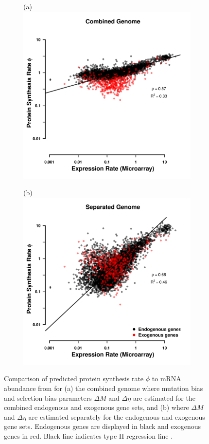 \documentclass[doublespacing,linenumbers]{bmcart-modified}
\newcommand{\DM}{\ensuremath{{\Delta M}}\xspace}
\newcommand{\DE}{\ensuremath{{\Delta \eta}}\xspace}
\begin{document}
\begin{figure}
    \centering
    \begin{subfigure}
        \centering
        (a) \includegraphics[width=.45\textwidth]{img/fig1a.pdf}%
    \end{subfigure}
    \begin{subfigure}
        \centering
        (b) \includegraphics[width=.45\textwidth]{img/fig1b.pdf}%
    \end{subfigure}
    \caption{Comparison of predicted protein synthesis rate $\phi$ to mRNA abundance from \cite{tsankov2010} for (a) the combined genome where mutation bias and selection bias parameters \DM and \DE are estimated for the combined endogenous and exogenous gene sets, and (b) where \DM and \DE are estimated separately for the endogenous and exogenous gene sets.
    Endogenous genes are displayed in black and exogenous genes in red. 
    Black line indicates type II regression line \citep{SokalAndRohlf1981}.}
    \label{fig:phi_corr_two_cond}
\end{figure}
\end{document}
